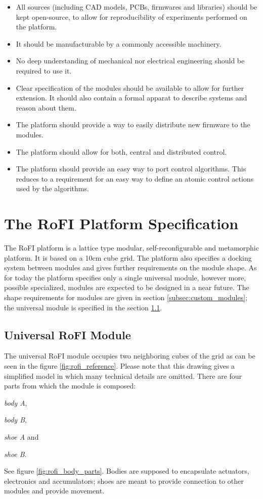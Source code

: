 \begin{itemize}
    \item All sources (including CAD models, PCBs, firmwares and libraries)
    should be kept open-source, to allow for reproducibility of experiments
    performed on the platform.
    \item It should be manufacturable by a commonly accessible machinery.
    \item No deep understanding of mechanical nor electrical engineering should
    be required to use it.
    \item Clear specification of the modules should be available to allow for
    further extension. It should also contain a formal apparat to describe
    systems and reason about them.
    \item The platform should provide a way to easily distribute new firmware to
    the modules.
    \item The platform should allow for both, central and distributed control.
    \item The platform should provide an easy way to port control algorithms.
    This reduces to a requirement for an easy way to define an atomic control
    actions used by the algorithms.
\end{itemize}

\section{The RoFI Platform Specification}

The RoFI platform is a lattice type modular, self-reconfigurable and metamorphic
platform. It is based on a 10cm cube grid. The platform also specifies a
docking system between modules and gives further requirements on the module
shape. As for today the platform specifies only a single universal module,
however more, possible specialized, modules are expected to be designed in a
near future. The shape requirements for modules are given in section
\ref{subsec:custom_modules}; the universal module is specified in the section
\ref{subsec:universal_module}.

\subsection{Universal RoFI Module}\label{subsec:universal_module}

The universal RoFI module occupies two neighboring cubes of the grid as can be
seen in the figure \ref{fig:rofi_reference}. Please note that this drawing gives
a simplified model in which many technical details are omitted. There are four
parts from which the module is composed:
\begin{enumerate*}
    \item \emph{body A},
    \item \emph{body B},
    \item \emph{shoe A} and
    \item \emph{shoe B}.
\end{enumerate*}
See figure \ref{fig:rofi_body_parts}. Bodies are supposed to encapsulate
actuators, electronics and accumulators; shoes are meant to provide connection
to other modules and provide movement.

